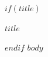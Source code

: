 \documentclass[12pt,a4paper]{article}
\begin{document}
$if(title)$
\begin{center}
{\LARGE\textbf{$title$}}
\end{center}
$endif$
$body$
\end{document}
